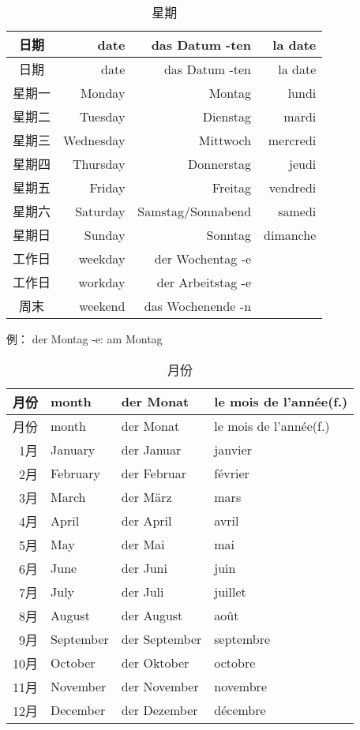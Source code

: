 \documentclass[12pt,A4paper,oneside,reqno]{amsart}
\numberwithin{equation}{section}
\theoremstyle{plain}
\theoremstyle{plain}
\theoremstyle{plain}
\numberwithin{equation}{section}
\theoremstyle{remark}
\begin{document}
\begin{longtable}{c|r|r|r}
	\hline
日期	&	date	&	das Datum -ten	&	la date	\\
	\hline
	\endhead
	\hline
日期	&	date	&	das Datum -ten	&	la date	\\
	\hline
	\endfirsthead	
	\hline
	\endfoot
	\hline	
	\caption{星期}
	\endlastfoot				
星期一	&	Monday	&	Montag	&	lundi	\\
星期二	&	Tuesday	&	Dienstag	&	mardi	\\
星期三	&	Wednesday	&	Mittwoch	&	mercredi	\\
星期四	&	Thursday	&	Donnerstag	&	jeudi	\\
星期五	&	Friday	&	Freitag	&	vendredi	\\
星期六	&	Saturday	&	Samstag/Sonnabend	&	samedi	\\
星期日	&	Sunday	&	Sonntag	&	dimanche	\\
工作日	&	weekday	&	der Wochentag -e	&		\\
工作日	&	workday	&	der Arbeitstag -e	&		\\
周末	&	weekend	&	das Wochenende -n	&		\\

\end{longtable}
例： der Montag -e: am Montag
\begin{longtable}{r|l|l|l}
	\hline
月份	&	month	&	der Monat	&	le mois de l'ann\'{e}e(f.)	\\
	\hline
	\endhead
	\hline
月份	&	month	&	der Monat	&	le mois de l'ann\'{e}e(f.)	\\
	\hline
	\endfirsthead	
	\hline
	\endfoot
	\hline	
	\caption{月份}
	\endlastfoot				
1月	&	January	&	der Januar	&	janvier	\\
2月	&	February	&	der Februar	&	f\'{e}vrier	\\
3月	&	March	&	der M\"{a}rz	&	mars	\\
4月	&	April	&	der April	&	avril	\\
5月	&	May	&	der Mai	&	mai	\\
6月	&	June	&	der Juni	&	juin	\\
7月	&	July	&	der Juli	&	juillet	\\
8月	&	August	&	der August	&	ao\^{u}t	\\
9月	&	September	&	der September	&	septembre	\\
10月	&	October	&	der Oktober	&	octobre	\\
11月	&	November	&	der November	&	novembre	\\
12月	&	December	&	der Dezember	&	d\'{e}cembre	\\

\end{longtable}
\end{document}
